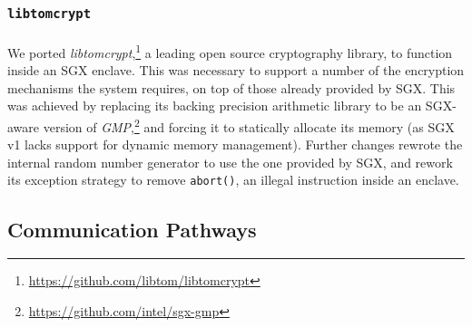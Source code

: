 \subsubsection{\texttt{libtomcrypt}}
\paragraph{} We ported \textit{libtomcrypt},\footnote{\url{https://github.com/libtom/libtomcrypt}} a leading open source cryptography library, to function inside an SGX enclave. This was necessary to support a number of the encryption mechanisms the system requires, on top of those already provided by SGX. This was achieved by replacing its backing precision arithmetic library to be an SGX-aware version of \textit{GMP},\footnote{\url{https://github.com/intel/sgx-gmp}} and forcing it to statically allocate its memory (as SGX v1 lacks support for dynamic memory management). Further changes rewrote the internal random number generator to use the one provided by SGX, and rework its exception strategy to remove \texttt{abort()}, an illegal instruction inside an enclave.

\subsection{Communication Pathways}
\label{sec:interdomain-comms}
